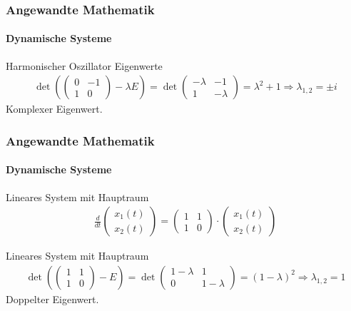 \documentclass{beamer}
\begin{document}
 \begin{frame}
    \frametitle{Angewandte Mathematik}
\framesubtitle{Dynamische Systeme }

\begin{block}{Harmonischer Oszillator Eigenwerte}
    \begin{align*}
    \det (\begin{pmatrix}
        0 & -1  \\ 1 & 0
    \end{pmatrix} - \lambda E) = 
    \det \begin{pmatrix}
        -\lambda & -1  \\ 1 & -\lambda  
    \end{pmatrix} = \lambda^2 +1 \Rightarrow \lambda_{1,2} = \pm i
\end{align*}
Komplexer Eigenwert.
 \end{block}
 \end{frame}


 \begin{frame}
    \frametitle{Angewandte Mathematik}
\framesubtitle{Dynamische Systeme }
\begin{block}{Lineares System mit Hauptraum}
\begin{align*}
    \frac{d}{dt}\begin{pmatrix}
        x_1(t) \\ x_2(t)
    \end{pmatrix} = 
\begin{pmatrix}
    1 & 1  \\ 1 & 0
\end{pmatrix} \cdot
\begin{pmatrix} 
    x_1(t) \\ x_2(t)
\end{pmatrix} 
\end{align*}
\end{block}

\begin{block}{Lineares System mit Hauptraum}
    \begin{align*}
    \det (\begin{pmatrix}
        1 & 1  \\ 1 & 0
    \end{pmatrix} - E) = 
    \det \begin{pmatrix}
        1-\lambda & 1  \\ 0 & 1-\lambda  
    \end{pmatrix} = (1-\lambda)^2 \Rightarrow \lambda_{1,2} = 1
\end{align*}
Doppelter Eigenwert.
\end{block}

\end{frame}
\end{document}
